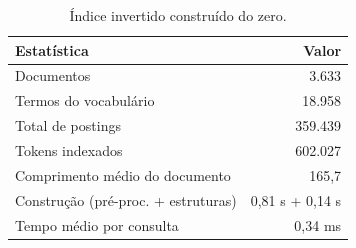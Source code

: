 \begin{table}[t]
\centering
\caption{Índice invertido construído do zero.}
\label{tab:index}
\small
\begin{tabular}{lr}
\toprule
Estatística & Valor \\
\midrule
Documentos & 3.633 \\
Termos do vocabulário & 18.958 \\
Total de postings & 359.439 \\
Tokens indexados & 602.027 \\
Comprimento médio do documento & 165,7 \\
Construção (pré-proc. + estruturas) & 0,81 s + 0,14 s \\
Tempo médio por consulta & 0,34 ms \\
\bottomrule
\end{tabular}
\end{table}
